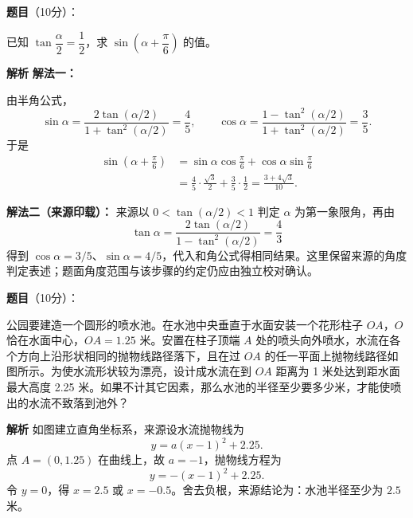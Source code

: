 \begin{answer}

\textbf{题目}（10分）：

已知 $\tan\dfrac\alpha2=\dfrac12$，求 $\sin\left(\alpha+\dfrac\pi6\right)$ 的值。

\textbf{解析}
\textbf{解法一：}

由半角公式，
\nopagebreak[4]
\[\sin\alpha=\frac{2\tan(\alpha/2)}{1+\tan^2(\alpha/2)}=\frac45,\qquad
\cos\alpha=\frac{1-\tan^2(\alpha/2)}{1+\tan^2(\alpha/2)}=\frac35.\]
于是
\nopagebreak[4]
\[\begin{aligned}
\sin\left(\alpha+\frac\pi6\right)
&=\sin\alpha\cos\frac\pi6+\cos\alpha\sin\frac\pi6\\
&=\frac45\cdot\frac{\sqrt3}{2}+\frac35\cdot\frac12
=\frac{3+4\sqrt3}{10}.
\end{aligned}\]

\textbf{解法二（来源印载）：} 来源以 $0<\tan(\alpha/2)<1$ 判定 $\alpha$ 为第一象限角，再由
\nopagebreak[4]
\[\tan\alpha=\frac{2\tan(\alpha/2)}{1-\tan^2(\alpha/2)}=\frac43\]
得到 $\cos\alpha=3/5$、$\sin\alpha=4/5$，代入和角公式得相同结果。这里保留来源的角度判定表述；题面角度范围与该步骤的约定仍应由独立校对确认。


\end{answer}
\begin{answer}

\textbf{题目}（10分）：

公园要建造一个圆形的喷水池。在水池中央垂直于水面安装一个花形柱子 $OA$，$O$ 恰在水面中心，$OA=1.25$ 米。安置在柱子顶端 $A$ 处的喷头向外喷水，水流在各个方向上沿形状相同的抛物线路径落下，且在过 $OA$ 的任一平面上抛物线路径如图所示。为使水流形状较为漂亮，设计成水流在到 $OA$ 距离为 1 米处达到距水面最大高度 2.25 米。如果不计其它因素，那么水池的半径至少要多少米，才能使喷出的水流不致落到池外？
\nopagebreak[4]
\begin{center}\end{center}
\nopagebreak[4]
\textbf{解析}
如图建立直角坐标系，来源设水流抛物线为
\nopagebreak[4]
\[y=a(x-1)^2+2.25.\]
点 $A=(0,1.25)$ 在曲线上，故 $a=-1$，抛物线方程为
\nopagebreak[4]
\[y=-(x-1)^2+2.25.\]
令 $y=0$，得 $x=2.5$ 或 $x=-0.5$。舍去负根，来源结论为：水池半径至少为 $2.5$ 米。


\end{answer}
